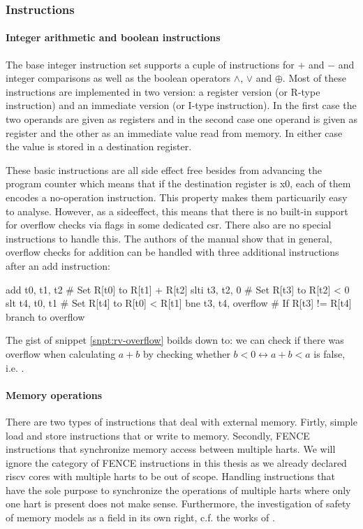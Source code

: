 \subsubsection{Instructions}

\paragraph{Integer arithmetic and boolean instructions}
The base integer instruction set supports a cuple of instructions for $ + $ and $ - $ and integer comparisons as well as the boolean operators $ \land $, $ \lor $ and $ \oplus $.
Most of these instructions are implemented in two version: a register version (or R-type instruction) and an immediate version (or I-type instruction).
In the first case the two operands are given as registers and in the second case one operand is given as register and the other as an immediate value read from memory.
In either case the value is stored in a destination register.

These basic instructions are all side effect free besides from advancing the program counter which means that if the destination register is x0, each of them encodes a no-operation instruction.
This property makes them particuarily easy to analyse.
However, as a sideeffect, this means that there is no built-in support for overflow checks via flags in some dedicated \gls{csr}.
There also are no special instructions to handle this.
The authors of the manual show that in general, overflow checks for addition can be handled with three additional instructions after an add instruction:

\begin{assmblr}[caption={General overflow checking \cite{RiscVISA}},label={snpt:rv-overflow}]
add  t0, t1, t2          # Set R[t0] to R[t1] + R[t2]
slti t3, t2, 0           # Set R[t3] to R[t2] < 0
slt  t4, t0, t1          # Set R[t4] to R[t0] < R[t1]
bne  t3, t4, overflow    # If R[t3] != R[t4] branch to overflow
\end{assmblr}

The gist of snippet \ref{snpt:rv-overflow} boilds down to: we can check if there was overflow when calculating $ a + b $ by checking whether $ b < 0 \leftrightarrow a + b < a $ is false, i.e. .

\paragraph{Memory operations}
There are two types of instructions that deal with external memory.
Firtly, simple load and store instructions that or write to memory.
Secondly, FENCE instructions that synchronize memory access between multiple \glspl{hart}.
We will ignore the category of FENCE instructions in this thesis as we already declared \gls{riscv} cores with multiple \glspl{hart} to be out of scope.
Handling instructions that have the sole purpose to synchronize the operations of multiple \glspl{hart} where only one \gls{hart} is present does not make sense.
Furthermore, the investigation of safety of memory models as a field in its own right, c.f. the works of .

